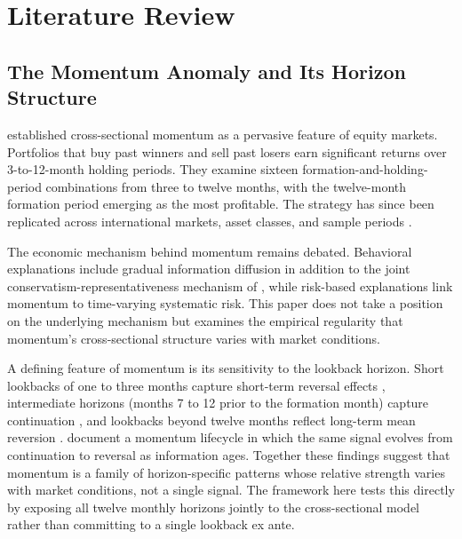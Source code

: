 
\clearpage
\section{Literature Review}\label{sec:literature}

\subsection{The Momentum Anomaly and Its Horizon Structure}\label{sec:lit_momentum}

\citet{JegadeeshTitman1993} established cross-sectional momentum as a pervasive feature of equity markets. Portfolios that buy past winners and sell past losers earn significant returns over 3-to-12-month holding periods. They examine sixteen formation-and-holding-period combinations from three to twelve months, with the twelve-month formation period emerging as the most profitable. The strategy has since been replicated across international markets, asset classes, and sample periods \citep{JegadeeshTitman2001, Asness2013}.

The economic mechanism behind momentum remains debated. Behavioral explanations include gradual information diffusion \citep{HongStein1999} in addition to the joint conservatism-representativeness mechanism of \citet{Barberis1998}, while risk-based explanations link momentum to time-varying systematic risk. This paper does not take a position on the underlying mechanism but examines the empirical regularity that momentum's cross-sectional structure varies with market conditions.

A defining feature of momentum is its sensitivity to the lookback horizon. Short lookbacks of one to three months capture short-term reversal effects \citep{Jegadeesh1990, Lehmann1990}, intermediate horizons (months 7 to 12 prior to the formation month) capture continuation \citep{NovyMarx2012}, and lookbacks beyond twelve months reflect long-term mean reversion \citep{DeBondtThaler1985}. \citet{LeeSwaminathan2000} document a momentum lifecycle in which the same signal evolves from continuation to reversal as information ages. Together these findings suggest that momentum is a family of horizon-specific patterns whose relative strength varies with market conditions, not a single signal. The framework here tests this directly by exposing all twelve monthly horizons jointly to the cross-sectional model rather than committing to a single lookback ex ante.

